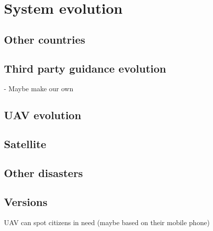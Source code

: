 \chapter{System evolution}
\label{ch:evolution}

\section{Other countries}

\section{Third party guidance evolution}
	- Maybe make our own

\section{UAV evolution}

\section{Satellite}

\section{Other disasters}

\section{Versions}

UAV can spot citizens in need (maybe based on their mobile phone)




